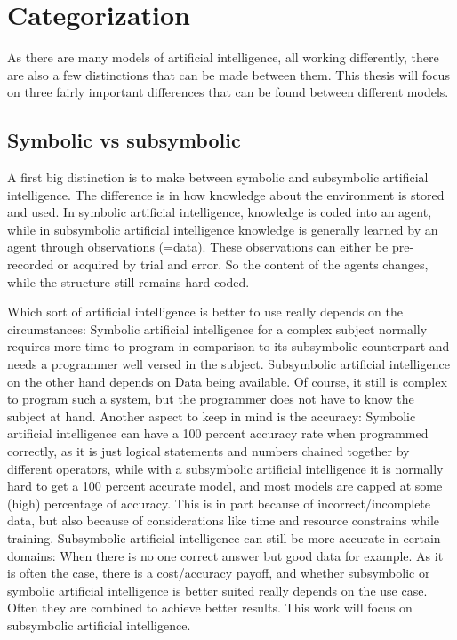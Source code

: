 \chapter{Categorization}
\label{sec:categorization}
As there are many models of artificial intelligence, all working differently, there are also a few distinctions that can be made between them. This thesis will focus on three fairly important differences that can be found between different models.
\section{Symbolic vs subsymbolic} \label{sec:categorization:symbolicvssub} \cite{SymbolicVsSubsymbolic}
A first big distinction is to make between symbolic and subsymbolic artificial intelligence. 
The difference is in how knowledge about the environment is stored and used.
In symbolic artificial intelligence, knowledge is coded into an agent, while in subsymbolic artificial intelligence knowledge is generally learned by an agent through observations (=data). These observations can either be pre-recorded or acquired by trial and error. So the content of the agents changes, while the structure still remains hard coded.

Which sort of artificial intelligence is better to use really depends on the circumstances: 
Symbolic artificial intelligence for a complex subject normally requires more time to program in comparison to its subsymbolic counterpart and needs a programmer well versed in the subject. 
Subsymbolic artificial intelligence on the other hand depends on Data being available. Of course, it still is complex to program such a system, but the programmer does not have to know the subject at hand. %
Another aspect to keep in mind is the accuracy: Symbolic artificial intelligence can have a 100 percent accuracy rate when programmed correctly, as it is just logical statements and numbers chained together by different operators, while with a subsymbolic artificial intelligence it is normally hard to get a 100 percent accurate model, and most models are capped at some (high) percentage of accuracy. This is in part because of incorrect/incomplete data, but also because of considerations like time and resource constrains while training. Subsymbolic artificial intelligence can still be more accurate in certain domains: When there is no one correct answer but good data for example.
As it is often the case, there is a cost/accuracy payoff, and whether subsymbolic or symbolic artificial intelligence is better suited really depends on the use case. Often they are combined to achieve better results. This work will focus on subsymbolic artificial intelligence. 


